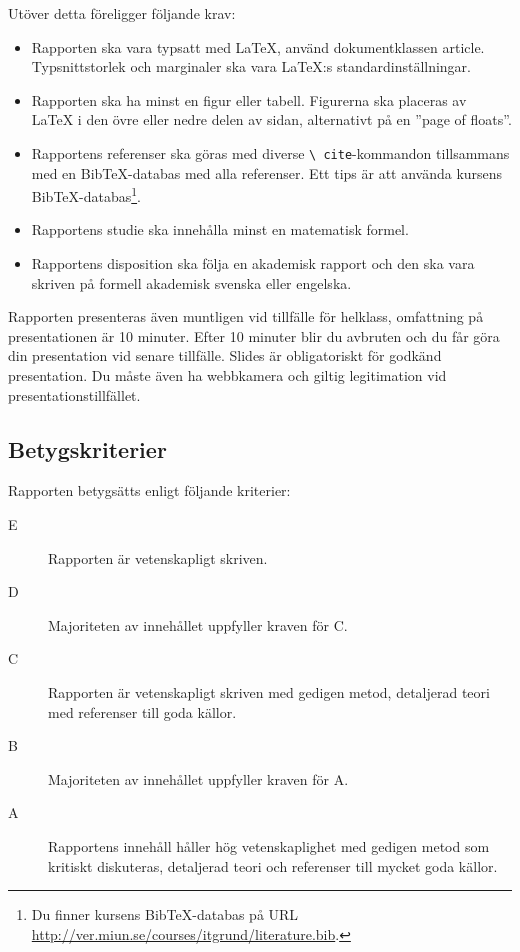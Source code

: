 \documentclass[a4paper]{miunasgn}
\begin{document}
Utöver detta föreligger följande krav:
\begin{itemize}
  \item Rapporten ska vara typsatt med LaTeX, använd dokumentklassen article.
    Typsnittstorlek och marginaler ska vara LaTeX:s standardinställningar.
  \item Rapporten ska ha minst en figur eller tabell.
    Figurerna ska placeras av LaTeX i den övre eller nedre delen av sidan, 
    alternativt på en ''page of floats''.
  \item Rapportens referenser ska göras med diverse \texttt{\textbackslash 
    cite}-kommandon tillsammans med en BibTeX-databas med alla referenser.
    Ett tips är att använda kursens BibTeX-databas\footnote{%
      Du finner kursens BibTeX-databas på URL 
      \url{http://ver.miun.se/courses/itgrund/literature.bib}.
    }.
  \item Rapportens studie ska innehålla minst en matematisk formel.
  \item Rapportens disposition ska följa en akademisk rapport och den ska vara 
    skriven på formell akademisk svenska eller engelska.
\end{itemize}

Rapporten presenteras även muntligen vid tillfälle för helklass, omfattning på 
presentationen är 10 minuter.
Efter 10 minuter blir du avbruten och du får göra din presentation vid senare 
tillfälle.
Slides är obligatoriskt för godkänd presentation.
Du måste även ha webbkamera och giltig legitimation vid 
presentationstillfället.

\subsection{Betygskriterier}

Rapporten betygsätts enligt följande kriterier:
\begin{description}
  \item[E] Rapporten är vetenskapligt skriven.
  \item[D] Majoriteten av innehållet uppfyller kraven för C.
  \item[C] Rapporten är vetenskapligt skriven med gedigen metod, detaljerad 
    teori med referenser till goda källor.
  \item[B] Majoriteten av innehållet uppfyller kraven för A.
  \item[A] Rapportens innehåll håller hög vetenskaplighet med gedigen metod som 
    kritiskt diskuteras, detaljerad teori och referenser till mycket goda 
    källor.
\end{description}


\printbibliography
\end{document}
